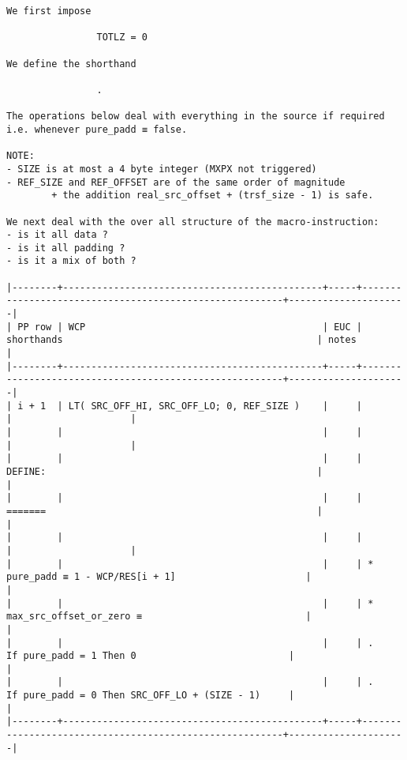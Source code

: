 \documentclass[varwidth=\maxdimen,margin=0.5cm,multi={verbatim}]{standalone}
\begin{document}
\begin{verbatim}
We first impose

                TOTLZ = 0

We define the shorthand

                .

The operations below deal with everything in the source if required i.e. whenever pure_padd ≡ false.

NOTE:
- SIZE is at most a 4 byte integer (MXPX not triggered)
- REF_SIZE and REF_OFFSET are of the same order of magnitude
        + the addition real_src_offset + (trsf_size - 1) is safe.   

We next deal with the over all structure of the macro-instruction:
- is it all data ?
- is it all padding ?
- is it a mix of both ?

|--------+----------------------------------------------+-----+--------------------------------------------------------+---------------------|
| PP row | WCP                                          | EUC | shorthands                                             | notes               |
|--------+----------------------------------------------+-----+--------------------------------------------------------+---------------------|
| i + 1  | LT( SRC_OFF_HI, SRC_OFF_LO; 0, REF_SIZE )    |     |                                                        |                     |
|        |                                              |     |                                                        |                     |
|        |                                              |     | DEFINE:                                                |                     |
|        |                                              |     | =======                                                |                     |
|        |                                              |     |                                                        |                     |
|        |                                              |     | * pure_padd ≡ 1 - WCP/RES[i + 1]                       |                     |
|        |                                              |     | * max_src_offset_or_zero ≡                             |                     |
|        |                                              |     | .    If pure_padd = 1 Then 0                           |                     |
|        |                                              |     | .    If pure_padd = 0 Then SRC_OFF_LO + (SIZE - 1)     |                     |
|--------+----------------------------------------------+-----+--------------------------------------------------------+---------------------|

\end{verbatim}
\end{document}
